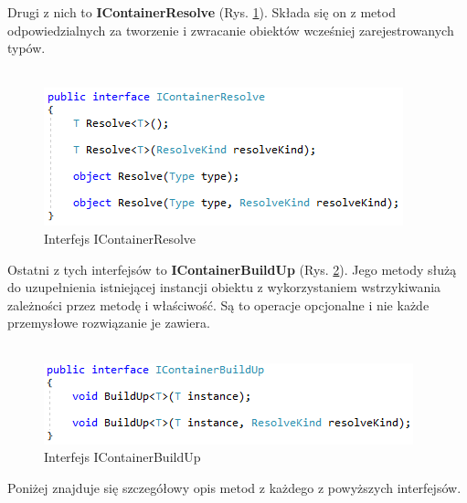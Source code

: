 \documentclass[12pt]{article}
\begin{document}
Drugi z nich to \textbf{IContainerResolve} (Rys. \ref{fig:IContainerResolve}). Składa się on z metod odpowiedzialnych za tworzenie i zwracanie obiektów wcześniej zarejestrowanych typów.\\ \\
\begin{figure}[H]
	\begin{center}
  		\includegraphics{IContainerResolve.png}
  		\caption{Interfejs IContainerResolve}
  		\label{fig:IContainerResolve}
	\end{center}
\end{figure}
Ostatni z tych interfejsów to \textbf{IContainerBuildUp} (Rys. \ref{fig:IContainerBuildUp}). Jego metody służą do uzupełnienia istniejącej instancji obiektu z wykorzystaniem wstrzykiwania zależności przez metodę i właściwość. Są to operacje opcjonalne i nie każde przemysłowe rozwiązanie je zawiera.\\ \\
\begin{figure}[H]
	\begin{center}
  		\includegraphics{IContainerBuildUp.png}
  		\caption{Interfejs IContainerBuildUp}
  		\label{fig:IContainerBuildUp}
	\end{center}
\end{figure}
Poniżej znajduje się szczegółowy opis metod z każdego z powyższych interfejsów.
\end{document}
